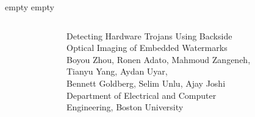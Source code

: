 \documentclass{beamer}
\newcommand{\titlebox}{
    \begin{center}
        \begin{tcolorbox}[left=2cm,right=2cm,arc=2cm,boxrule=5mm,width=\textwidth,colframe=blue!70!black,colback=yellow!5]
            \begin{center}
}
\newcommand{\titleboxend}{
            \end{center}
        \end{tcolorbox}
    \end{center}
}
\begin{document}
    {\color{white}empty empty}\\
    \begin{columns}
            \begin{figure}
            \end{figure}
            \titlebox
            \Huge{Detecting Hardware Trojans Using Backside Optical Imaging of
            Embedded Watermarks}\\
            \large{Boyou Zhou, Ronen Adato, Mahmoud Zangeneh, Tianyu Yang, Aydan
            Uyar, \\Bennett Goldberg, Selim Unlu, Ajay Joshi\\}
            \large{ Department of Electrical and Computer Engineering, Boston
            University \\}
            \titleboxend
            \begin{figure}
            \end{figure}
    \end{columns}
    \vspace{0.2in}
\end{document}
